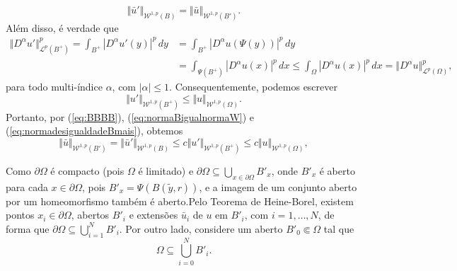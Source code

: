 \documentclass[a4paper, 11pt]{book}
\theoremstyle{definition}
\newcommand{\cL}{\mathcal{L}}
\newcommand{\cW}{\mathcal{W}}
\begin{document}
\begin{prf}
\begin{equation}
        \Vert \bar u' \Vert_{\cW^{1,p}(B)} = \Vert  \bar u \Vert_{\cW^{1,p}(B')}.
    \end{equation}
    Além disso, é verdade que
    \[
        \begin{aligned}
            \Vert D^\alpha u' \Vert_{\cL^p(B^+)}^p = \int_{B^+} |D^\alpha u'(y) |^p \,dy &= \int_{B^+} |D^\alpha u (\Psi(y))|^p \,dy\\ &= \int_{\Psi(B^+)} |D^\alpha u(x)|^p \,dx \leqslant \int_{\Omega} |D^\alpha u(x)|^p \,dx = \Vert D^\alpha u \Vert_{\cL^p(\Omega)}^p,
        \end{aligned}
    \]
    para todo multi-índice $\alpha$, com $|\alpha| \leqslant 1$.
    Consequentemente, podemos escrever
    \begin{equation} \label{eq:normadesigualdadeBmais}
        \Vert u' \Vert_{\cW^{1,p}(B^+)} \leqslant \Vert u \Vert_{\cW^{1,p}(\Omega)}.
    \end{equation}
    Portanto, por (\ref{eq:BBBB}), (\ref{eq:normaBigualnormaW}) e (\ref{eq:normadesigualdadeBmais}), obtemos
    \begin{equation} \label{eq:desigualdadeWO}
        \Vert \bar u \Vert_{\cW^{1,p}(B')} = \Vert \bar u' \Vert_{\cW^{1,p}(B)} \leqslant c \Vert u' \Vert_{\cW^{1,p}(B^+)} \leqslant c \Vert u \Vert_{\cW^{1,p}(\Omega)},
    \end{equation}

    Como $\partial\Omega$ é compacto (pois $\Omega$ é limitado) e $\partial \Omega \subseteq \bigcup_{x \in \partial\Omega} B'_x$,
    onde $B'_x$ é aberto para cada $x \in \partial\Omega$, pois $B'_x = \Psi(B(\tilde y, r))$, e a imagem de um conjunto aberto por um homeomorfismo também é aberto.Pelo Teorema de Heine-Borel, existem pontos $x_i \in \partial\Omega$, abertos $B'_i$ e extensões $\bar u_i$ de $u$ em $B'_i$, com $i = 1,\dots,N$, de forma que $\partial\Omega \subseteq \bigcup_{i=1}^N B'_i$.
    Por outro lado, considere um aberto $B'_0 \Subset \Omega$ tal que
    \[
        \Omega \subseteq \bigcup_{i=0}^N B'_i.
    \]


\end{prf}
\end{document}
